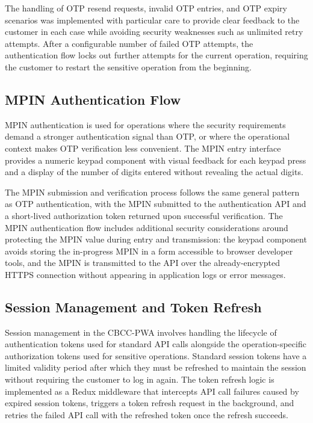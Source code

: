 The handling of OTP resend requests, invalid OTP entries, and OTP expiry scenarios was implemented with particular care to provide clear feedback to the customer in each case while avoiding security weaknesses such as unlimited retry attempts. After a configurable number of failed OTP attempts, the authentication flow locks out further attempts for the current operation, requiring the customer to restart the sensitive operation from the beginning.

\subsection{MPIN Authentication Flow}

MPIN authentication is used for operations where the security requirements demand a stronger authentication signal than OTP, or where the operational context makes OTP verification less convenient. The MPIN entry interface provides a numeric keypad component with visual feedback for each keypad press and a display of the number of digits entered without revealing the actual digits.

The MPIN submission and verification process follows the same general pattern as OTP authentication, with the MPIN submitted to the authentication API and a short-lived authorization token returned upon successful verification. The MPIN authentication flow includes additional security considerations around protecting the MPIN value during entry and transmission: the keypad component avoids storing the in-progress MPIN in a form accessible to browser developer tools, and the MPIN is transmitted to the API over the already-encrypted HTTPS connection without appearing in application logs or error messages.

\subsection{Session Management and Token Refresh}

Session management in the CBCC-PWA involves handling the lifecycle of authentication tokens used for standard API calls alongside the operation-specific authorization tokens used for sensitive operations. Standard session tokens have a limited validity period after which they must be refreshed to maintain the session without requiring the customer to log in again. The token refresh logic is implemented as a Redux middleware that intercepts API call failures caused by expired session tokens, triggers a token refresh request in the background, and retries the failed API call with the refreshed token once the refresh succeeds.

